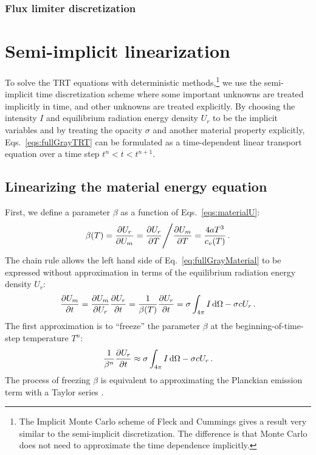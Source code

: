 \subsubsection{Flux limiter discretization}
\cite{Ols2007}

\section{Semi-implicit linearization}

To solve the TRT equations with deterministic methods,\footnote{The Implicit
Monte Carlo scheme of Fleck and Cummings \cite{Fle1971} gives a result very
similar to the semi-implicit discretization. The difference is that Monte
Carlo does not need to approximate the time dependence implicitly.} we use the
semi-implicit time
discretization scheme \cite{Kno1999a,Kno2001,Low2004} where some important
unknowns are treated implicitly in
time, and other unknowns are treated explicitly. By choosing the intensity $I$
and equilibrium radiation energy density $U_r$ to be the implicit variables and 
by treating the opacity $\sigma$ and another material property explicitly,
Eqs.~\eqref{eqs:fullGrayTRT} can be formulated as a time-dependent linear
transport equation over a time step $t^n < t < t^{n+1}$.

\subsection{Linearizing the material energy equation}
First, we define a parameter $\beta$ as a function of Eqs.~\eqref{eqs:materialU}:
\begin{equation} \label{eq:beta}
  \beta(T) = \frac{\partial U_r}{\partial U_m} 
  = \frac{\partial U_r}{\partial T} \Bigg/ \frac{\partial U_m}{\partial T}
  = \frac{4 a T^3}{c_v(T)} \,.
\end{equation}
The chain rule allows the left hand side of Eq.~\eqref{eq:fullGrayMaterial} to be
expressed without approximation in terms of the equilibrium radiation energy
density $U_r$:
\begin{equation*}
  \frac{\partial U_m}{\partial t} = \frac{\partial U_m}{\partial U_r} \frac{\partial U_r}{\partial t} = \frac{1}{\beta(T)}
  \frac{\partial U_r}{\partial t} = \sigma \int_{4\pi}  I \mathop{}\!\mathrm{d} \Omega - \sigma c U_r \,.
\end{equation*}
The first approximation is to ``freeze'' the parameter $\beta$ at the beginning-of-time-step temperature $T^n$:
\begin{equation}\label{eq:frozenBeta}
  \frac{1}{\beta^n}
  \frac{\partial U_r}{\partial t} \approx \sigma \int_{4\pi}  I \mathop{}\!\mathrm{d} \Omega - \sigma c U_r \,.
\end{equation}
The process of freezing $\beta$ is equivalent to approximating the
Planckian emission term with a Taylor series \cite{Kno2007}.

